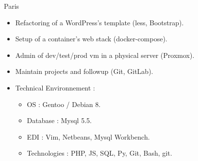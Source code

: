 \documentclass[10pt,a4paper,sans]{moderncv}
\begin{document}
{Paris}{
  \begin{itemize}%
    \item Refactoring of a WordPress's template (less, Bootstrap).
    \item Setup of a container's web stack (docker-compose).
    \item Admin of dev/test/prod vm in a physical server (Proxmox).
    \item Maintain projects and followup (Git, GitLab).
    \item Technical Environnement :
      \begin{itemize}%
        \item OS : Gentoo / Debian 8.
        \item Database : Mysql 5.5.
        \item EDI : Vim, Netbeans, Mysql Workbench.
        \item Technologies : PHP, JS, SQL, Py, Git, Bash, git.
      \end{itemize}
  \end{itemize}}
\end{document}
